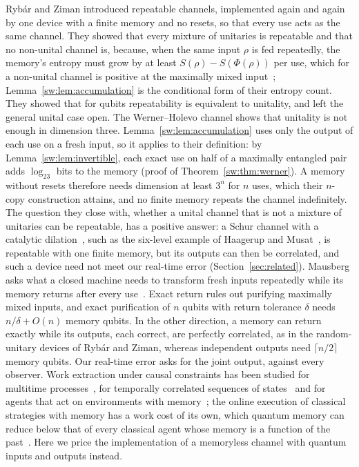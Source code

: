 Ryb\'ar and Ziman introduced repeatable channels, implemented again and again by one device with a finite memory and no resets, so that every use acts as the same channel. They showed that every mixture of unitaries is repeatable and that no non-unital channel is, because, when the same input $\rho$ is fed repeatedly, the memory's entropy must grow by at least $S(\rho)-S(\Phi(\rho))$ per use, which for a non-unital channel is positive at the maximally mixed input~\cite{RybarZiman}; Lemma~\ref{sw:lem:accumulation} is the conditional form of their entropy count. They showed that for qubits repeatability is equivalent to unitality, and left the general unital case open. The Werner--Holevo channel shows that unitality is not enough in dimension three. Lemma~\ref{sw:lem:accumulation} uses only the output of each use on a fresh input, so it applies to their definition: by Lemma~\ref{sw:lem:invertible}, each exact use on half of a maximally entangled pair adds $\log_23$ bits to the memory (proof of Theorem~\ref{sw:thm:werner}). A memory without resets therefore needs dimension at least $3^n$ for $n$ uses, which their $n$-copy construction attains, and no finite memory repeats the channel indefinitely. The question they close with, whether a unital channel that is not a mixture of unitaries can be repeatable, has a positive answer: a Schur channel with a catalytic dilation~\cite[Prop.~15]{LieEtAl26}, such as the six-level example of Haagerup and Musat~\cite[Ex.~3.3]{HaagerupMusat11}, is repeatable with one finite memory, but its outputs can then be correlated, and such a device need not meet our real-time error (Section~\ref{sec:related}). Mausberg asks what a closed machine needs to transform fresh inputs repeatedly while its memory returns after every use~\cite{Mausberg26}. Exact return rules out purifying maximally mixed inputs, and exact purification of $n$ qubits with return tolerance $\delta$ needs $n/\delta+O(n)$ memory qubits. In the other direction, a memory can return exactly while its outputs, each correct, are perfectly correlated, as in the random-unitary devices of Ryb\'ar and Ziman, whereas independent outputs need $\lceil n/2\rceil$ memory qubits. Our real-time error asks for the joint output, against every observer. Work extraction under causal constraints has been studied for multitime processes~\cite{ZambonAdesso}, for temporally correlated sequences of states~\cite{HuangTOFE} and for agents that act on environments with memory~\cite{Fiderer26}; the online execution of classical strategies with memory has a work cost of its own, which quantum memory can reduce below that of every classical agent whose memory is a function of the past~\cite[Result~2]{Thompson25}. Here we price the implementation of a memoryless channel with quantum inputs and outputs instead.


